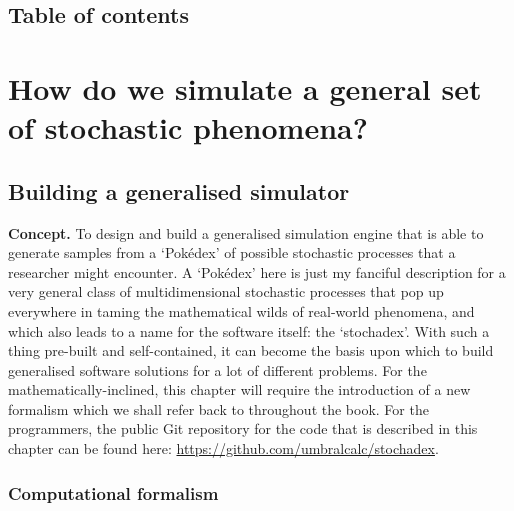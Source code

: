 \documentclass{book}
\begin{document}
\chapter*{Table of contents}
\vspace*{-3cm}
{\sffamily \tableofcontents}
\mainmatter


\part*{{ How do we simulate a general set of stochastic phenomena?}}


\chapter{\sffamily Building a generalised simulator}

{\bfseries\sffamily Concept.} To design and build a generalised simulation engine that is able to generate samples from a `Pokédex' of possible stochastic processes that a researcher might encounter. A `Pokédex' here is just my fanciful description for a very general class of multidimensional stochastic processes that pop up everywhere in taming the mathematical wilds of real-world phenomena, and which also leads to a name for the software itself: the `stochadex'. With such a thing pre-built and self-contained, it can become the basis upon which to build generalised software solutions for a lot of different problems. For the mathematically-inclined, this chapter will require the introduction of a new formalism which we shall refer back to throughout the book. For the programmers, the public Git repository for the code that is described in this chapter can be found here: \href{https://github.com/umbralcalc/stochadex}{https://github.com/umbralcalc/stochadex}.

\section{\sffamily Computational formalism}
\end{document}
